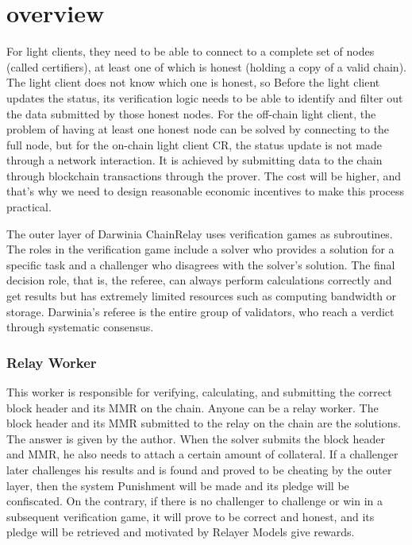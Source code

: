 \section{overview}


For light clients, they need to be able to connect to a complete set of nodes (called certifiers), at least one of which is honest (holding a copy of a valid chain). The light client does not know which one is honest, so Before the light client updates the status, its verification logic needs to be able to identify and filter out the data submitted by those honest nodes. For the off-chain light client, the problem of having at least one honest node can be solved by connecting to the full node, but for the on-chain light client CR, the status update is not made through a network interaction. It is achieved by submitting data to the chain through blockchain transactions through the prover. The cost will be higher, and that's why we need to design reasonable economic incentives to make this process practical.

The outer layer of Darwinia ChainRelay uses verification games as subroutines. The roles in the verification game include a solver who provides a solution for a specific task and a challenger who disagrees with the solver's solution. The final decision role, that is, the referee, can always perform calculations correctly and get results but has extremely limited resources such as computing bandwidth or storage. Darwinia's referee is the entire group of validators, who reach a verdict through systematic consensus.

\subsubsection*{Relay Worker} 

This worker is responsible for verifying, calculating, and submitting the correct block header and its MMR on the chain. Anyone can be a relay worker. The block header and its MMR submitted to the relay on the chain are the solutions. The answer is given by the author. When the solver submits the block header and MMR, he also needs to attach a certain amount of collateral. If a challenger later challenges his results and is found and proved to be cheating by the outer layer, then the system Punishment will be made and its pledge will be confiscated. On the contrary, if there is no challenger to challenge or win in a subsequent verification game, it will prove to be correct and honest, and its pledge will be retrieved and motivated by Relayer Models give rewards.

